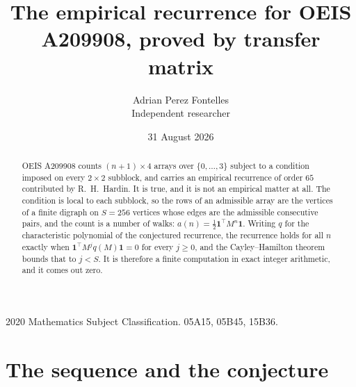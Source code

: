 \documentclass[11pt,a4paper]{article}
\title{The empirical recurrence for OEIS A209908, proved by transfer matrix}
\author{Adrian Perez Fontelles\\ \small Independent researcher}
\date{31 August 2026}
\theoremstyle{plain}
\theoremstyle{definition}
\begin{document}
\maketitle

\begin{abstract}
OEIS A209908 counts $(n+1)\times4$ arrays over $\{0,\dots,3\}$ subject to a condition imposed on
every $2\times2$ subblock, and carries an empirical recurrence of order $65$ contributed
by R.~H.~Hardin. It is true, and it is not an empirical matter at all. The condition is local
to each subblock, so the rows of an admissible array are the vertices of a finite digraph
on $S=256$ vertices whose edges are the admissible consecutive pairs, and the count is a
number of walks: $a(n)=\tfrac1{2}\mathbf{1}^{\!\top}M^{n}\mathbf{1}$. Writing $q$
for the characteristic polynomial of the conjectured recurrence, the recurrence holds for all
$n$ exactly when $\mathbf{1}^{\!\top}M^{j}q(M)\mathbf{1}=0$ for every $j\ge0$, and the
Cayley--Hamilton theorem bounds that to $j<S$. It is therefore a finite computation in exact
integer arithmetic, and it comes out zero.
\end{abstract}

\noindent\small 2020 Mathematics Subject Classification. 05A15, 05B45, 15B36.\normalsize

\section{The sequence and the conjecture}
\end{document}
